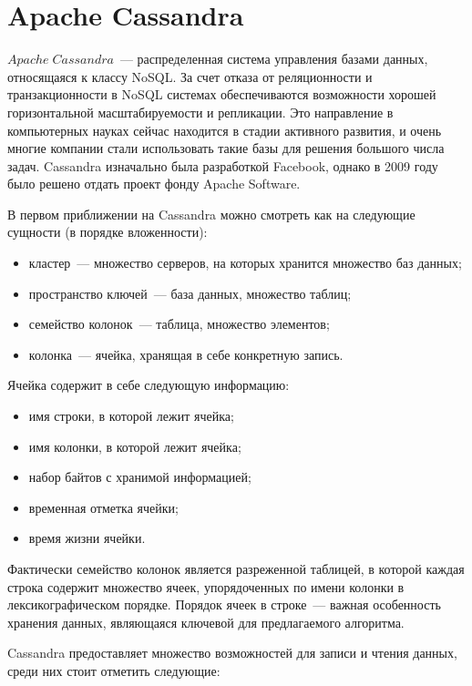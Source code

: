 \section{Apache Cassandra}

$Apache\;Cassandra$~--- распределенная система управления базами данных, относящаяся к классу NoSQL. За счет отказа от реляционности и транзакционности в NoSQL системах обеспечиваются возможности хорошей горизонтальной масштабируемости и репликации. Это направление в компьютерных науках сейчас находится в стадии активного развития, и очень многие компании стали использовать такие базы для решения большого числа задач. Cassandra изначально была разработкой Facebook, однако в 2009 году было решено отдать проект фонду Apache Software.

В первом приближении на Cassandra можно смотреть как на следующие сущности (в порядке вложенности):

\begin{itemize}
	\item кластер~--- множество серверов, на которых хранится множество баз данных;
	\item пространство ключей~--- база данных, множество таблиц;
	\item семейство колонок~--- таблица, множество элементов;
	\item колонка~--- ячейка, хранящая в себе конкретную запись.
\end{itemize}

Ячейка содержит в себе следующую информацию:

\begin{itemize}
	\item имя строки, в которой лежит ячейка;
	\item имя колонки, в которой лежит ячейка;
	\item набор байтов с хранимой информацией;
	\item временная отметка ячейки;
	\item время жизни ячейки.
\end{itemize}

Фактически семейство колонок является разреженной таблицей, в которой каждая строка содержит множество ячеек, упорядоченных по имени колонки в лексикографическом порядке. Порядок ячеек в строке~--- важная особенность хранения данных, являющаяся ключевой для предлагаемого алгоритма.

Cassandra предоставляет множество возможностей для записи и чтения данных, среди них стоит отметить следующие:

